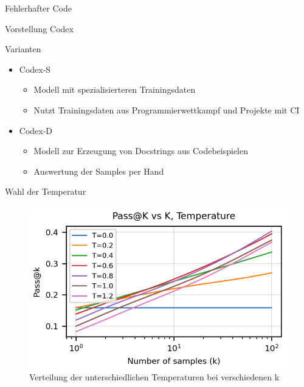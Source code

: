 \documentclass{beamer}              %
\begin{document}
\begin{frame}{Fehlerhafter Code}
\begin{frame}[fragile]{Vorstellung Codex}
\begin{itemize}
\end{itemize}
\end{frame}

\begin{frame}{Varianten}
\begin{itemize}
    \item Codex-S\cite{chen2021evaluating}
    \begin{itemize}
        \item Modell mit spezialisierteren Trainingsdaten
        \item Nutzt Trainingsdaten aus Programmierwettkampf und Projekte mit CI
    \end{itemize}
    \item Codex-D\cite{chen2021evaluating}
    \begin{itemize}
        \item Modell zur Erzeugung von Docstrings aus Codebeispielen
        \item Auswertung der Samples per Hand
    \end{itemize}
\end{itemize}
\end{frame}

\begin{frame}{Wahl der Temperatur}
    \begin{figure}
        \centering
        \includegraphics[width=0.7\paperwidth]{images/passkvstemp.png}
        \caption{Verteilung der unterschiedlichen Temperaturen bei verschiedenen k\cite{chen2021evaluating}}
    \end{figure}
\end{frame}


\end{frame}
\end{document}
